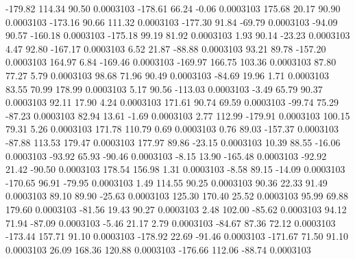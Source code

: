      -179.82      114.34       90.50     0.0003103
     -178.61       66.24       -0.06     0.0003103
      175.68       20.17       90.90     0.0003103
     -173.16       90.66      111.32     0.0003103
     -177.30       91.84      -69.79     0.0003103
      -94.09       90.57     -160.18     0.0003103
     -175.18       99.19       81.92     0.0003103
        1.93       90.14      -23.23     0.0003103
        4.47       92.80     -167.17     0.0003103
        6.52       21.87      -88.88     0.0003103
       93.21       89.78     -157.20     0.0003103
      164.97        6.84     -169.46     0.0003103
     -169.97      166.75      103.36     0.0003103
       87.80       77.27        5.79     0.0003103
       98.68       71.96       90.49     0.0003103
      -84.69       19.96        1.71     0.0003103
       83.55       70.99      178.99     0.0003103
        5.17       90.56     -113.03     0.0003103
       -3.49       65.79       90.37     0.0003103
       92.11       17.90        4.24     0.0003103
      171.61       90.74       69.59     0.0003103
      -99.74       75.29      -87.23     0.0003103
       82.94       13.61       -1.69     0.0003103
        2.77      112.99     -179.91     0.0003103
      100.15       79.31        5.26     0.0003103
      171.78      110.79        0.69     0.0003103
        0.76       89.03     -157.37     0.0003103
      -87.88      113.53      179.47     0.0003103
      177.97       89.86      -23.15     0.0003103
       10.39       88.55      -16.06     0.0003103
      -93.92       65.93      -90.46     0.0003103
       -8.15       13.90     -165.48     0.0003103
      -92.92       21.42      -90.50     0.0003103
      178.54      156.98        1.31     0.0003103
       -8.58       89.15      -14.09     0.0003103
     -170.65       96.91      -79.95     0.0003103
        1.49      114.55       90.25     0.0003103
       90.36       22.33       91.49     0.0003103
       89.10       89.90      -25.63     0.0003103
      125.30      170.40       25.52     0.0003103
       95.99       69.88      179.60     0.0003103
      -81.56       19.43       90.27     0.0003103
        2.48      102.00      -85.62     0.0003103
       94.12       71.94      -87.09     0.0003103
       -5.46       21.17        2.79     0.0003103
      -84.67       87.36       72.12     0.0003103
     -173.44      157.71       91.10     0.0003103
     -178.92       22.69      -91.46     0.0003103
     -171.67       71.50       91.10     0.0003103
       26.09      168.36      120.88     0.0003103
     -176.66      112.06      -88.74     0.0003103
